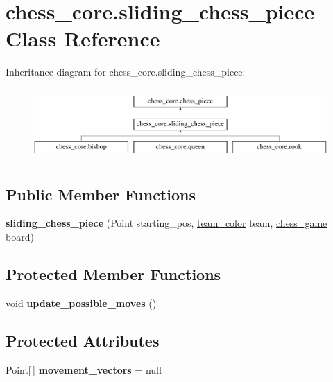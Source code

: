 \hypertarget{classchess__core_1_1sliding__chess__piece}{}\section{chess\+\_\+core.\+sliding\+\_\+chess\+\_\+piece Class Reference}
\label{classchess__core_1_1sliding__chess__piece}
Inheritance diagram for chess\+\_\+core.\+sliding\+\_\+chess\+\_\+piece\+:\begin{figure}[H]
\begin{center}
\leavevmode
\includegraphics[height=2.745098cm]{classchess__core_1_1sliding__chess__piece}
\end{center}
\end{figure}
\subsection*{Public Member Functions}
\begin{DoxyCompactItemize}
\item 
\hypertarget{classchess__core_1_1sliding__chess__piece_a85cd8228689f00b73ecac63dd7daf714}{}{\bfseries sliding\+\_\+chess\+\_\+piece} (Point starting\+\_\+pos, \hyperlink{enumchess__core_1_1team__color}{team\+\_\+color} team, \hyperlink{classchess__core_1_1chess__game}{chess\+\_\+game} board)\label{classchess__core_1_1sliding__chess__piece_a85cd8228689f00b73ecac63dd7daf714}

\end{DoxyCompactItemize}
\subsection*{Protected Member Functions}
\begin{DoxyCompactItemize}
\item 
\hypertarget{classchess__core_1_1sliding__chess__piece_a9c6781ff5068ad3b4a6737b2732b9498}{}void {\bfseries update\+\_\+possible\+\_\+moves} ()\label{classchess__core_1_1sliding__chess__piece_a9c6781ff5068ad3b4a6737b2732b9498}

\end{DoxyCompactItemize}
\subsection*{Protected Attributes}
\begin{DoxyCompactItemize}
\item 
\hypertarget{classchess__core_1_1sliding__chess__piece_a76f45c6e7ad7e2d83d33a25ab0244813}{}Point\mbox{[}$\,$\mbox{]} {\bfseries movement\+\_\+vectors} = null\label{classchess__core_1_1sliding__chess__piece_a76f45c6e7ad7e2d83d33a25ab0244813}

\end{DoxyCompactItemize}



